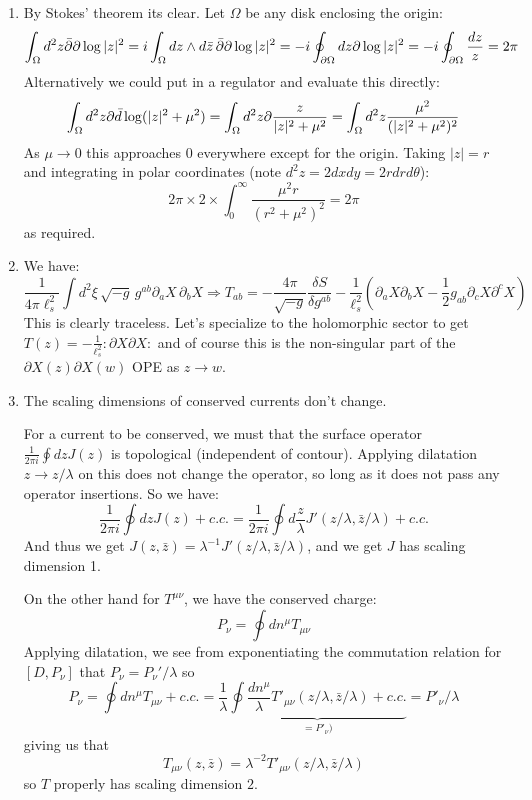 \documentclass[11pt]{article}
\begin{document}
\begin{enumerate}
	\item By Stokes' theorem its clear. Let $\Omega$ be any disk enclosing the origin: 
	\[
		\int_{\Omega} d^2 z \bar {\partial} \partial \log |z|^2 =  i \int_{\Omega} dz \wedge d\bar z \,\bar {\partial} \partial \log|z|^2 = -i \oint_{\partial \Omega} dz \partial \log|z|^2 = - i \oint_{\partial \Omega} \frac{dz}{z} = 2\pi 
	\]
	Alternatively we could put in a regulator and evaluate this directly:
	\[
		\int_\Omega d^2 z \partial \bar d \log(|z|^2 + \mu^2) = \int_\Omega d^2 z \partial \frac{z}{|z|^2 + \mu^2} = \int_\Omega d^2 z \frac{\mu^2}{(|z|^2 + \mu^2)^2}
	\]
	As $\mu \to 0$ this approaches $0$ everywhere except for the origin. Taking $|z| = r$ and integrating in polar coordinates (note $d^2 z = 2 dx dy = 2 r dr d\theta$):
	\[
		2\pi \times 2 \times \int_{0}^\infty \frac{\mu^2 r}{(r^2 + \mu^2)^2} = 2 \pi
	\]
	as required.
	
	\item We have:
	\[
		\frac{1}{4 \pi \ell_s^2} \int d^2 \xi \, \sqrt{-g}\, g^{ab} \partial_a X\, \partial_b X \Rightarrow T_{ab} = -\frac{4\pi}{\sqrt{-g}} \frac{\delta S}{\delta g^{ab}} -\frac{1}{\ell_s^2} \left( \partial_a X \partial_b X - \frac12 g_{ab} \partial_c X \partial^c X \right)
	\]
	This is clearly traceless. Let's specialize to the holomorphic sector to get $T(z) = -\frac{1}{\ell_s^2} :\partial X \partial X:$ and of course this is the non-singular part of the $\partial X(z) \partial X(w)$ OPE as $z \to w$.
	
	
	\item The scaling dimensions of conserved currents don't change.
	
	For a current to be conserved, we must that the surface operator $\frac{1}{2\pi i} \oint dz J(z)$ is topological (independent of contour). Applying dilatation $z \to z/\lambda$ on this does not change the operator, so long as it does not pass any operator insertions. So we have:
	\[
		\frac{1}{2\pi i} \oint dz J(z) + c.c. = \frac{1}{2\pi i} \oint d\frac{z}{
		\lambda} J'(z/\lambda, \bar z/\lambda) + c.c.
	\]
	And thus we get $J(z, \bar z) = \lambda^{-1} J'(z/\lambda, \bar z/\lambda)$, and we get $J$ has scaling dimension 1.
	
	On the other hand for $T^{\mu \nu}$, we have the conserved charge:
	\[
		P_\nu = \oint dn^\mu T_{\mu \nu}
	\]
	Applying dilatation, we see from exponentiating the commutation relation for $[D, P_\nu]$ that $P_\nu = P_\nu'/\lambda$ so
	\[
		P_\nu = \oint dn^\mu T_{\mu \nu} + c.c. = \frac{1}{\lambda} \underbrace{\oint \frac{dn^\mu}{\lambda} T'_{\mu \nu}(z/\lambda, \bar z/\lambda) + c.c.}_{= P'_\nu)} = P'_\nu/\lambda
	\]
	giving us that
	\[
		T_{\mu \nu}(z, \bar z) = \lambda^{-2} T'_{\mu \nu}(z/\lambda, \bar z/\lambda)
	\]
	so $T$ properly has scaling dimension $2$.
	

\end{enumerate}
\end{document}
